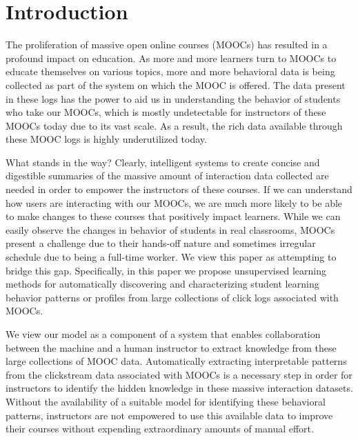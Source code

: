 \section{Introduction}
The proliferation of massive open online courses (MOOCs) has resulted in a
profound impact on education. As more and more learners turn to MOOCs to
educate themselves on various topics, more and more behavioral data is
being collected as part of the system on which the MOOC is offered. The
data present in these logs has the power to aid us in understanding the
behavior of students who take our MOOCs, which is mostly undetectable for
instructors of these MOOCs today due to its vast scale. As a result, the
rich data available through these MOOC logs is highly underutilized today.

What stands in the way? Clearly, intelligent systems to create concise and
digestible summaries of the massive amount of interaction data collected
are needed in order to empower the instructors of these courses. If we can
understand how users are interacting with our MOOCs, we are much more
likely to be able to make changes to these courses that positively impact
learners. While we can easily observe the changes in behavior of students
in real classrooms, MOOCs present a challenge due to their hands-off
nature and sometimes irregular schedule due to being a full-time worker.   
We view this paper as attempting to bridge this gap. Specifically,
in this paper we propose unsupervised learning methods for automatically
discovering and characterizing student learning behavior patterns or profiles from large
collections of click logs associated with MOOCs. 

We view our model as a component of a system that enables collaboration
between the machine and a human instructor to extract knowledge from these
large collections of MOOC data. Automatically extracting interpretable
patterns from the clickstream data associated with MOOCs is a necessary
step in order for instructors to identify the hidden knowledge in these
massive interaction datasets. Without the availability of a suitable model
for identifying these behavioral patterns, instructors are not empowered to
use this available data to improve their courses without expending
extraordinary amounts of manual effort.

